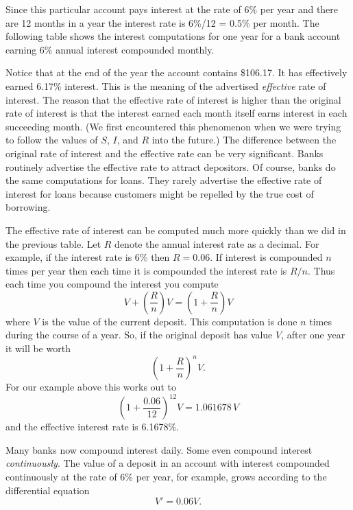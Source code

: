 Since this particular account pays interest at the rate of 6\% per
year and there are 12 months in a year the interest rate is 6\%/12 =
0.5\% per month.  The following table shows the interest computations
for one year for a bank account earning 6\% annual interest compounded
monthly.

Notice that at the end of the year the account contains \$106.17.  It
has effectively earned 6.17\% interest.  This is the meaning of the
advertised {\em effective\/} rate of interest.  The reason that the
effective rate of interest is higher than the original rate of
interest is that the interest earned each month itself earns interest
in each succeeding month.  (We first encountered this phenomenon when
we were trying to follow the values of $S$, $I$, and $R$ into the
future.)  The difference between the original rate of interest and the
effective rate can be very significant.  Banks routinely advertise the
effective rate to attract depositors.  Of course, banks do the same
computations for loans.  They rarely advertise the effective rate of
interest for loans because customers might be repelled by the true
cost of borrowing.

The effective rate of interest can be computed much more quickly than
we did in the previous table. Let $R$ denote the annual interest rate
as a decimal.  For example, if the interest rate is 6\% then $R =
0.06$. If interest is compounded $n$ times per year then each time it
is compounded the interest rate is $R/n$.  Thus each time you compound
the interest you compute
\[
V + \left(\dfrac{R}{n}\right)V = \left({1 + \dfrac{R}{n}}\right)V
\]
where $V$ is the value of the current deposit.  This computation is
done $n$ times during the course of a year.  So, if the original
deposit has value $V$, after one year it will be worth
\[
\left({1 + \dfrac{R}{n}}\right)^nV.
\]
For our example above this works out to
\[
\left(1 + \dfrac{0.06}{12}\right)^{12}V = 1.061678 \, V
\]
and the effective interest rate is 6.1678\%.

Many banks now compound interest daily.  Some even compound interest
{\em continuously}.  The value of a deposit in an account with
interest compounded continuously at the rate of 6\% per year, for
example, grows according to the differential equation
\[
V' = 0.06V.
\]



